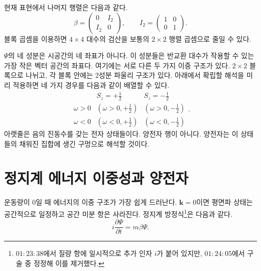현재 표현에서 나머지 행렬은 다음과 같다.
\begin{equation}
\beta=
\begin{pmatrix}
0&I_2\\
I_2&0
\end{pmatrix},
\qquad
I_2=
\begin{pmatrix}
1&0\\
0&1
\end{pmatrix}.
\end{equation}
블록 곱셈을 이용하면 \(4\times4\) 대수의 검산을 보통의 \(2\times2\) 행렬 곱셈으로 줄일 수 있다.

\begin{classroomqa}
\end{classroomqa}

\(\Psi\)의 네 성분은 시공간의 네 좌표가 아니다. 이 성분들은 반교환 대수가 작용할 수 있는 가장 작은 벡터 공간의 좌표다. 여기에는 서로 다른 두 가지 이중 구조가 있다. \(2\times2\) 블록으로 나뉘고, 각 블록 안에는 2성분 파울리 구조가 있다. 아래에서 확립할 해석을 미리 적용하면 네 가지 경우를 다음과 같이 배열할 수 있다.
\begin{equation}
\begin{array}{c|cc}
& S_z=+\tfrac12 & S_z=-\tfrac12\\ \hline
\omega>0 & (\omega>0,+\tfrac12) & (\omega>0,-\tfrac12)\\
\omega<0 & (\omega<0,+\tfrac12) & (\omega<0,-\tfrac12)
\end{array}.
\end{equation}
아랫줄은 음의 진동수를 갖는 전자 상태들이다. 양전자 행이 아니다. 양전자는 이 상태들의 채워진 집합에 생긴 구멍으로 해석할 것이다.

\section{정지계 에너지 이중성과 양전자}

운동량이 0일 때 에너지의 이중 구조가 가장 쉽게 드러난다. \(\mathbf{k}=0\)이면 평면파 상태는 공간적으로 일정하고 공간 미분 항은 사라진다. 정지계 방정식\footnote{\(01{:}23{:}38\)에서 질량 항에 일시적으로 추가 인자 \(i\)가 붙어 있지만, \(01{:}24{:}05\)에서 구술 중 정정해 이를 제거했다.}은 다음과 같다.
\begin{equation}
i\frac{\partial\Psi}{\partial t}=m\beta\Psi.
\end{equation}

